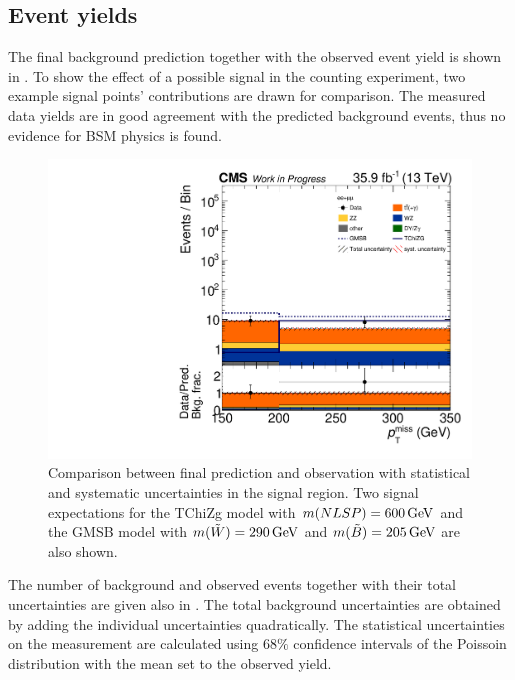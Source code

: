 \subsection{Event yields}
The final background prediction together with the observed event yield is shown in .
To show the effect of a possible signal in the counting experiment, two example signal points' contributions are drawn for comparison. The measured data yields are in good agreement with the predicted background events, thus no evidence for BSM physics is found.
\begin{figure}[tbp]
 \centering
 \includegraphics[width=\pairwidth]{figures/UnblindingPlots/final_MC_log}
 \caption{Comparison between final prediction and observation with statistical and systematic uncertainties in the signal region. Two signal expectations for the TChiZg model with $m(NLSP)=600\,\text{Ge\hspace{-.08em}V}$ and the GMSB model with $m(\tilde{W})=290\,\text{Ge\hspace{-.08em}V}$ and $m(\tilde{B})=205\,\text{Ge\hspace{-.08em}V}$ are also shown.}
 \label{fig:result}
\end{figure}
The number of background and observed events together with their total uncertainties are given also in . The total background uncertainties are obtained by adding the individual uncertainties quadratically. The statistical uncertainties on the measurement are calculated using $68\%$ confidence intervals of the Poissoin distribution with the mean set to the observed yield.
